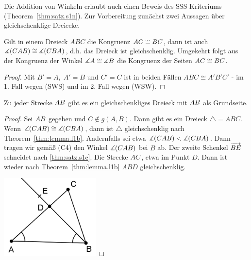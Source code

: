 Die Addition von Winkeln erlaubt auch einen
Beweis des SSS-Kriteriums (Theorem~\ref{thm:satz.s1n}).
Zur Vorbereitung zunächst zwei Aussagen über gleichschenklige Dreiecke.


\begin{thm}\label{thm:lemma.l1b}
Gilt in einem Dreieck $ABC$ die Kongruenz
${AC}\cong{BC}$, dann ist auch $\mbox{$\measuredangle$}(CAB)\cong\mbox{$\measuredangle$}(CBA)$, d.h.
das Dreieck ist gleichschenklig. Umgekehrt folgt aus der Kongruenz
der Winkel $\mbox{$\measuredangle$} A\cong\mbox{$\measuredangle$} B$ die Kongruenz der Seiten
${AC}\cong{BC}$.
\end{thm}

\begin{proof}
Mit $B'=A,\;A'=B$ und $C'=C$ ist in beiden F\"{a}llen
$ABC \cong A'B'C'$ - im 1. Fall wegen (SWS) und im 2. Fall
wegen (WSW).
\end{proof}


\begin{thm}\label{thm:folg.f1a}
Zu jeder Strecke ${AB}$ gibt es ein gleichschenkliges Dreieck
mit ${AB}$ als Grundseite.
\end{thm}


\begin{proof}
Sei ${AB}$ gegeben und $C\notin g(A,B)$. Dann
gibt es ein Dreieck $\triangle= ABC$. Wenn
$\mbox{$\measuredangle$}(CAB)\cong\mbox{$\measuredangle$}(CBA)$, dann ist $\triangle$ gleichschenklig nach
Theorem~\ref{thm:lemma.l1b}. Andernfalls sei etwa $\mbox{$\measuredangle$}(CAB)<\mbox{$\measuredangle$}(CBA)$.
Dann tragen wir gem\"{a}{\ss} (C4) den Winkel $\mbox{$\measuredangle$}(CAB)$ bei $B$ ab. Der
zweite Schenkel $\mbox{${\overrightarrow{BE}}$}$ schneidet nach \ref{thm:satz.s1c}. 
Die Strecke ${AC}$, etwa im Punkt $D$. Dann ist wieder nach 
Theorem~\ref{thm:lemma.l1b} $ABD$ gleichschenklig.


\centerline{\includegraphics[width=5cm]{BILDER/1-2-20-Dreieck.png}}


\end{proof}




